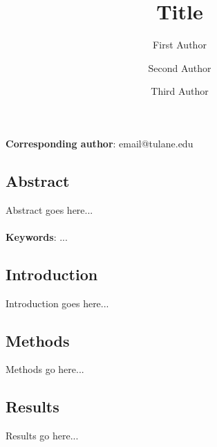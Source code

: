 \documentclass[12pt]{article}
\begin{document}
\setcounter{page}{1}

\title{Title}

\author[a]{First Author}
\author[b]{Second Author}
\author[b]{Third Author}


\maketitle

\noindent \textbf{Corresponding author}:  email@tulane.edu 


\thispagestyle{empty}

\vspace{-1cm}



\clearpage





\thispagestyle{fancy}
\subsection*{Abstract}

Abstract goes here...


\paragraph*{}
\noindent \textbf{Keywords}: ...  







\clearpage

\subsection*{Introduction}

Introduction goes here...

\subsection*{Methods}

Methods go here...

\subsection*{Results}

Results go here...
\end{document}
